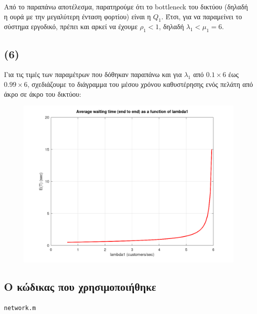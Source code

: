 \documentclass[a4paper]{article}
\begin{document}
Από το παραπάνω αποτέλεσμα, παρατηρούμε ότι το bottleneck του δικτύου (δηλαδή η ουρά με την μεγαλύτερη ένταση φορτίου) είναι η $Q_1$. Έτσι, για να παραμείνει το σύστημα εργοδικό, πρέπει και αρκεί να έχουμε $ρ_1 < 1$, δηλαδή $λ_1 < μ_1 = 6$.

\subsection*{(6)}

Για τις τιμές των παραμέτρων που δόθηκαν παραπάνω και για $λ_1$ από $ 0.1 \times 6 $ έως $ 0.99 \times 6 $, σχεδιάζουμε το διάγραμμα του μέσου χρόνου καθυστέρησης ενός πελάτη από άκρο σε άκρο του δικτύου:

\begin{figure}[H]
	\includegraphics[width=\textwidth]{network.png}
\end{figure}

\subsection*{Ο κώδικας που χρησιμοποιήθηκε}

\texttt{network.m}

\end{document}
